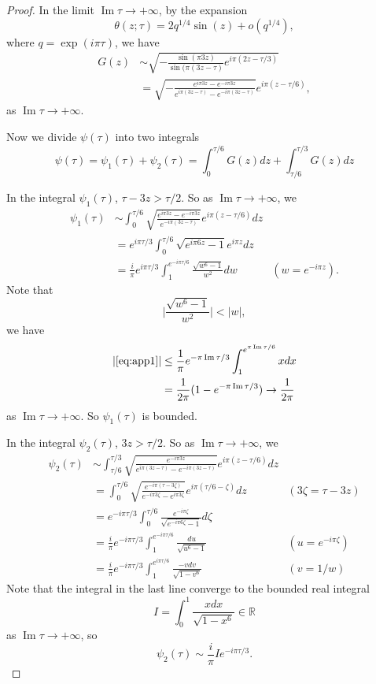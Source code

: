 \documentclass[a4paper]{amsart}
\newcommand{\im}{\operatorname{Im}}
\theoremstyle{plain}
\theoremstyle{definition}
\begin{document}
\begin{proof}
	In the limit $\im\tau \to +\infty$, by the expansion~\cite[(20.2.1)]{DLMF}
	\[
		\theta(z;\tau) = 2 q^{1/4} \sin(z) + o(q^{1/4}),
	\]
	where $q = \exp(i \pi \tau)$, we have
	\begin{align*}
		G(z)
		&\sim
		\sqrt{-\frac{\sin(\pi 3z)}{\sin(\pi (3z - \tau)} e^{i \pi (2z - \tau/3)}}\\
			&= \sqrt{-\frac{e^{i \pi 3z} - e^{-i \pi 3z}}{e^{i \pi (3z - \tau)} - e^{-i \pi (3z - \tau)}}} e^{i \pi (z - \tau/6)},
		\end{align*}
		as $\im\tau \to +\infty$.

		Now we divide $\psi(\tau)$ into two integrals
		\[
			\psi(\tau) = \psi_1(\tau) + \psi_2(\tau) = \int_0^{\tau/6} G(z) dz + \int_{\tau/6}^{\tau/3} G(z) dz
		\]

		In the integral $\psi_1(\tau)$, $\tau - 3z > \tau/2$.  So as $\im \tau \to +\infty$, we 
		\begin{align}
			\psi_1(\tau)
			&\sim \int_0^{\tau/6} \sqrt{\frac{e^{i \pi 3z} - e^{-i \pi 3z}}{e^{-i \pi (3z - \tau)}}} e^{i \pi (z - \tau/6)} dz\nonumber\\
			&= e^{i \pi \tau/3} \int_0^{\tau/6} \sqrt{e^{i \pi 6z} - 1} e^{i \pi z} dz\nonumber\\
			&= \frac{i}{\pi} e^{i \pi \tau/3} \int_1^{e^{-i\pi\tau/6}} \frac{\sqrt{w^6-1}}{w^2} dw  & (w = e^{-i\pi z}).\label{eq:app1}
		\end{align}
		Note that
		\[
			\Big| \frac{\sqrt{w^6-1}}{w^2} \Big| < |w|,
		\]
		we have
		\begin{align*}
			| \text{\eqref{eq:app1}} |
			&\le \frac{1}{\pi} e^{-\pi \im\tau/3} \int_1^{e^{\pi\im\tau/6}} x dx \\
			& = \frac{1}{2\pi} (1 - e^{-\pi\im\tau/3}) \to \frac{1}{2\pi}
		\end{align*}
		as $\im\tau \to +\infty$.  So $\psi_1(\tau)$ is bounded.

		In the integral $\psi_2(\tau)$, $3z > \tau/2$.  So as $\im \tau \to +\infty$, we 
		\begin{align*}
			\psi_2(\tau)
			&\sim \int_{\tau/6}^{\tau/3} \sqrt{\frac{e^{-i \pi 3z}}{e^{i \pi (3z - \tau)} - e^{-i \pi (3z - \tau)}}} e^{i \pi (z - \tau/6)} dz\\
			&= \int_{0}^{\tau/6} \sqrt{\frac{e^{-i \pi (\tau - 3\zeta)}}{e^{- i \pi 3\zeta} - e^{i \pi 3\zeta}}} e^{i \pi (\tau/6 - \zeta)} dz & (3\zeta = \tau - 3z)\\
			&= e^{-i \pi \tau/3} \int_0^{\tau/6} \frac{e^{-i\pi \zeta}}{\sqrt{e^{-i\pi 6\zeta} -1}} d\zeta\\
			&= \frac{i}{\pi} e^{-i \pi \tau/3} \int_1^{e^{-i\pi \tau/6}} \frac{du}{\sqrt{u^6 -1}} & (u = e^{-i \pi \zeta})\\
			&= \frac{i}{\pi} e^{-i \pi \tau/3} \int_1^{e^{i\pi \tau/6}} \frac{-v dv}{\sqrt{1 - v^6}} & (v = 1/w)
		\end{align*}
		Note that the integral in the last line converge to the bounded real integral
		\[
			I = \int_0^1 \frac{x dx}{\sqrt{1 - x^6}} \in \mathbb{R}
		\]
		as $\im\tau \to +\infty$, so
		\[
			\psi_2(\tau) \sim \frac{i}{\pi} I e^{-i\pi \tau/3}.
		\]


\end{proof}
\end{document}
